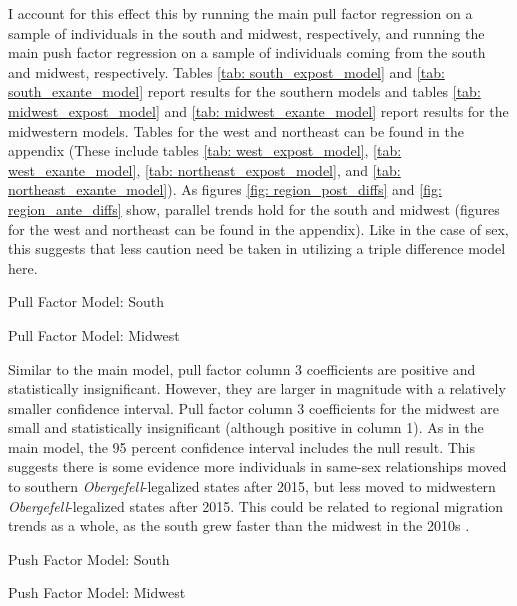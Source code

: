 \documentclass[12pt,letterpaper]{article}
\begin{document}
I account for this effect this by running the main pull factor regression on a sample of individuals in the south and midwest, respectively, and running the main push factor regression on a sample of individuals coming from the south and midwest, respectively. Tables \ref{tab: south_expost_model} and \ref{tab: south_exante_model} report results for the southern models and tables \ref{tab: midwest_expost_model} and \ref{tab: midwest_exante_model} report results for the midwestern models. Tables for the west and northeast can be found in the appendix (These include tables \ref{tab: west_expost_model}, \ref{tab: west_exante_model}, \ref{tab: northeast_expost_model}, and \ref{tab: northeast_exante_model}).
\FloatBarrier
As figures \ref{fig: region_post_diffs} and \ref{fig: region_ante_diffs} show, parallel trends hold for the south and midwest (figures for the west and northeast can be found in the appendix). Like in the case of sex, this suggests that less caution need be taken in utilizing a triple difference model here. 
\begin{table}[htbp]
    \centering
    \caption{Pull Factor Model: South}
    \label{tab: south_expost_model}
    
\end{table}
\begin{table}[htbp]
    \centering
    \caption{Pull Factor Model: Midwest}
    \label{tab: midwest_expost_model}
    
\end{table}
\FloatBarrier
Similar to the main model, pull factor column 3 coefficients are positive and statistically insignificant. However, they are larger in magnitude with a relatively smaller confidence interval. Pull factor column 3 coefficients for the midwest are small and statistically insignificant (although positive in column 1).  As in the main model, the 95 percent confidence interval includes the null result. This suggests there is some evidence more individuals in same-sex relationships moved to southern \textit{Obergefell}-legalized states after 2015, but less moved to midwestern \textit{Obergefell}-legalized states after 2015. This could be related to regional migration trends as a whole, as the south grew faster than the midwest in the 2010s \citep{31}.

\begin{table}[htbp]
    \centering
    \caption{Push Factor Model: South}
    \label{tab: south_exante_model}
    
\end{table}
\begin{table}[htbp]
    \centering
    \caption{Push Factor Model: Midwest}
    \label{tab: midwest_exante_model}
    
\end{table}
\end{document}
